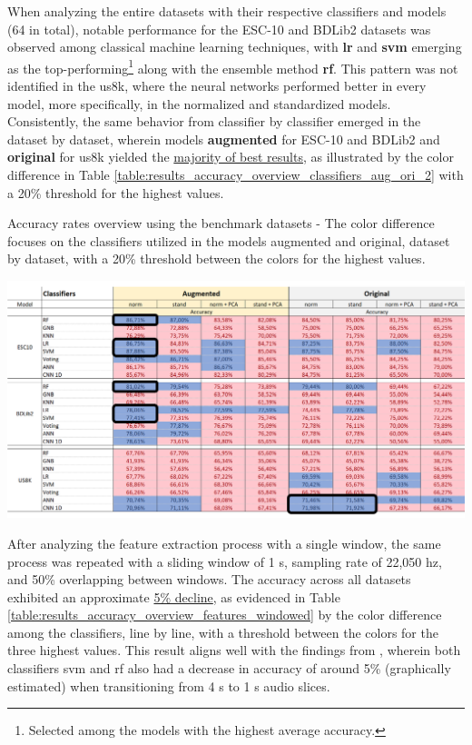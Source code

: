 When analyzing the entire datasets with their respective classifiers and models (64 in total), notable performance for the ESC-10 and BDLib2 datasets was observed among classical machine learning techniques, with \textbf{\gls{lr}} and \textbf{\gls{svm}} emerging as the top-performing\footnote{Selected among the models with the highest average accuracy.} along with the ensemble method \textbf{\gls{rf}}. This pattern was not identified in the \gls{us8k}, where the neural networks performed better in every model, more specifically, in the normalized and standardized models. Consistently, the same behavior from classifier by classifier emerged in the dataset by dataset, wherein models \textbf{augmented} for ESC-10 and BDLib2 and \textbf{original} for \gls{us8k} yielded the \underline{majority of best results}, as illustrated by the color difference in Table \ref{table:results_accuracy_overview_classifiers_aug_ori_2} with a 20\% threshold for the highest values.

\begin{table}[ht!]
    \caption[Accuracy rates overview using the benchmark datasets - Models augmented x original (Focus on the classifiers dataset by dataset)]{Accuracy rates overview using the benchmark datasets - The color difference focuses on the classifiers utilized in the models augmented and original, dataset by dataset, with a 20\% threshold between the colors for the highest values.}
    \label{table:results_accuracy_overview_classifiers_aug_ori_2}
     \raggedright
    \includegraphics[width=1\textwidth]{resources/images/060-results/Results_classification_overview_aug_x_ori_2.png}
\end{table}

After analyzing the feature extraction process with a single window, the same process was repeated with a sliding window of 1 \gls{s}, sampling rate of 22,050 \gls{hz}, and 50\% overlapping between windows. The accuracy across all datasets exhibited an approximate \underline{5\% decline}, as evidenced in Table \ref{table:results_accuracy_overview_features_windowed} by the color difference among the classifiers, line by line, with a
threshold between the colors for the three highest values. This result aligns well with the findings from \textcite{Salamon2014}, wherein both classifiers \gls{svm} and \gls{rf} also had a decrease in accuracy of around 5\% (graphically estimated) when transitioning from 4 \gls{s} to 1 \gls{s} audio slices. 

